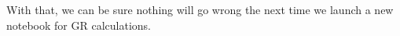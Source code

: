 \documentclass{book}
\theoremstyle{definition}
\begin{document}
With that, we can be sure nothing will go wrong the next time we launch a new notebook for GR calculations.






















































































												
\end{document}
